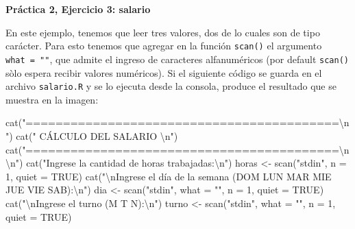\documentclass[
]{book}
\newenvironment{Shaded}{\begin{snugshade}}{\end{snugshade}}
\newcommand{\AttributeTok}[1]{\textcolor[rgb]{0.77,0.63,0.00}{#1}}
\newcommand{\ConstantTok}[1]{\textcolor[rgb]{0.00,0.00,0.00}{#1}}
\newcommand{\DecValTok}[1]{\textcolor[rgb]{0.00,0.00,0.81}{#1}}
\newcommand{\FunctionTok}[1]{\textcolor[rgb]{0.00,0.00,0.00}{#1}}
\newcommand{\NormalTok}[1]{#1}
\newcommand{\OtherTok}[1]{\textcolor[rgb]{0.56,0.35,0.01}{#1}}
\newcommand{\SpecialCharTok}[1]{\textcolor[rgb]{0.00,0.00,0.00}{#1}}
\newcommand{\StringTok}[1]{\textcolor[rgb]{0.31,0.60,0.02}{#1}}
\begin{document}
\textbf{Práctica 2, Ejercicio 3: salario}

En este ejemplo, tenemos que leer tres valores, dos de lo cuales son de tipo carácter. Para esto tenemos que agregar en la función \texttt{scan()} el argumento \texttt{what\ =\ ""}, que admite el ingreso de caracteres alfanuméricos (por default \texttt{scan()} sòlo espera recibir valores numéricos). Si el siguiente código se guarda en el archivo \texttt{salario.R} y se lo ejecuta desde la consola, produce el resultado que se muestra en la imagen:

\begin{Shaded}
\begin{Highlighting}[]
\FunctionTok{cat}\NormalTok{(}\StringTok{"==========================================}\SpecialCharTok{\textbackslash{}n}\StringTok{"}\NormalTok{)}
\FunctionTok{cat}\NormalTok{(}\StringTok{"           CÁLCULO DEL SALARIO            }\SpecialCharTok{\textbackslash{}n}\StringTok{"}\NormalTok{)}
\FunctionTok{cat}\NormalTok{(}\StringTok{"==========================================}\SpecialCharTok{\textbackslash{}n\textbackslash{}n}\StringTok{"}\NormalTok{)}
\FunctionTok{cat}\NormalTok{(}\StringTok{"Ingrese la cantidad de horas trabajadas:}\SpecialCharTok{\textbackslash{}n}\StringTok{"}\NormalTok{)}
\NormalTok{horas }\OtherTok{\textless{}{-}} \FunctionTok{scan}\NormalTok{(}\StringTok{"stdin"}\NormalTok{, }\AttributeTok{n =} \DecValTok{1}\NormalTok{, }\AttributeTok{quiet =} \ConstantTok{TRUE}\NormalTok{)}
\FunctionTok{cat}\NormalTok{(}\StringTok{"}\SpecialCharTok{\textbackslash{}n}\StringTok{Ingrese el día de la semana (DOM LUN MAR MIE JUE VIE SAB):}\SpecialCharTok{\textbackslash{}n}\StringTok{"}\NormalTok{)}
\NormalTok{dia }\OtherTok{\textless{}{-}} \FunctionTok{scan}\NormalTok{(}\StringTok{"stdin"}\NormalTok{, }\AttributeTok{what =} \StringTok{""}\NormalTok{, }\AttributeTok{n =} \DecValTok{1}\NormalTok{, }\AttributeTok{quiet =} \ConstantTok{TRUE}\NormalTok{)}
\FunctionTok{cat}\NormalTok{(}\StringTok{"}\SpecialCharTok{\textbackslash{}n}\StringTok{Ingrese el turno (M T N):}\SpecialCharTok{\textbackslash{}n}\StringTok{"}\NormalTok{)}
\NormalTok{turno }\OtherTok{\textless{}{-}} \FunctionTok{scan}\NormalTok{(}\StringTok{"stdin"}\NormalTok{, }\AttributeTok{what =} \StringTok{""}\NormalTok{, }\AttributeTok{n =} \DecValTok{1}\NormalTok{, }\AttributeTok{quiet =} \ConstantTok{TRUE}\NormalTok{)}


\end{Highlighting}
\end{Shaded}
\end{document}
